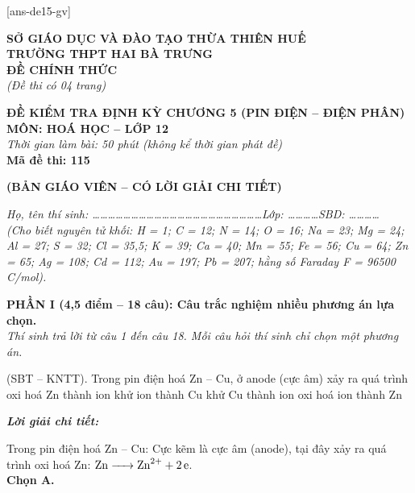 \documentclass[11pt,a4paper]{article}
\def\loigiai#1{
\par\begingroup\color{blue!80!black}\small
\noindent\textbf{\textit{Lời giải chi tiết:}}\par
#1\par\endgroup}
\begin{document}
[ans-de15-gv]

\noindent
\begin{minipage}[t]{0.48\textwidth}
	\textbf{SỞ GIÁO DỤC VÀ ĐÀO TẠO THỪA THIÊN HUẾ}\\
	\textbf{TRƯỜNG THPT HAI BÀ TRƯNG}\\
	\textbf{ĐỀ CHÍNH THỨC}\\
	\textit{(Đề thi có 04 trang)}
\end{minipage}\hfill
\begin{minipage}[t]{0.48\textwidth}
	\raggedleft
	\textbf{\color{mainGreen}ĐỀ KIỂM TRA ĐỊNH KỲ CHƯƠNG 5 (PIN ĐIỆN – ĐIỆN PHÂN)}\\
	\textbf{MÔN: HOÁ HỌC -- LỚP 12}\\
	\textit{Thời gian làm bài: 50 phút (không kể thời gian phát đề)}\\
	\textbf{Mã đề thi: 115}
\end{minipage}


\vspace{0.1cm}
\begin{center}
	\textbf{\color{hfRed}\Large (BẢN GIÁO VIÊN -- CÓ LỜI GIẢI CHI TIẾT)}
\end{center}

\vspace{1pt}
\noindent\textit{Họ, tên thí sinh: \dots\dots\dots\dots\dots\dots\dots\dots\dots\dots\dots\dots\dots\dots\dots\dots\dots\dots\dots\dots\dots\dots Lớp: \dots\dots\dots\dots SBD: \dots\dots\dots\dots}\\
\noindent\textit{(Cho biết nguyên tử khối: H = 1; C = 12; N = 14; O = 16; Na = 23; Mg = 24; Al = 27; S = 32; Cl = 35,5; K = 39; Ca = 40; Mn = 55; Fe = 56; Cu = 64; Zn = 65; Ag = 108; Cd = 112; Au = 197; Pb = 207; hằng số Faraday F = 96500 C/mol).}

\vspace{2pt}
\noindent
\textbf{PHẦN I (4,5 điểm -- 18 câu): Câu trắc nghiệm nhiều phương án lựa chọn.}\\
\textit{Thí sinh trả lời từ câu 1 đến câu 18. Mỗi câu hỏi thí sinh chỉ chọn một phương án.}

\setcounter{ex}{0}

\begin{ex}
(SBT – KNTT). Trong pin điện hoá Zn -- Cu, ở anode (cực âm) xảy ra quá trình
\choice
{\True oxi hoá Zn thành ion }
{khử ion  thành Cu}
{khử Cu thành ion }
{oxi hoá ion  thành Zn}
\loigiai{
Trong pin điện hoá Zn -- Cu: Cực kẽm là cực âm (anode), tại đây xảy ra quá trình oxi hoá Zn: $\ce{Zn -> Zn^2+ + 2e}$.\\
\textbf{Chọn A.}}
\end{ex}
\end{document}
